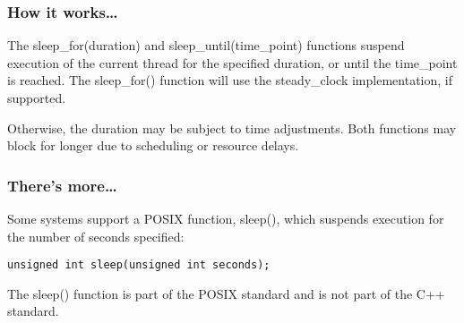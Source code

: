 \subsubsection{How it works…}

The sleep\_for(duration) and sleep\_until(time\_point) functions suspend execution of the current thread for the specified duration, or until the time\_point is reached. The sleep\_for() function will use the steady\_clock implementation, if supported.

Otherwise, the duration may be subject to time adjustments. Both functions may block for longer due to scheduling or resource delays.

\subsubsection{There's more…}

Some systems support a POSIX function, sleep(), which suspends execution for the number of seconds specified:

\begin{lstlisting}[style=styleCXX]
unsigned int sleep(unsigned int seconds);
\end{lstlisting}

The sleep() function is part of the POSIX standard and is not part of the C++ standard.








